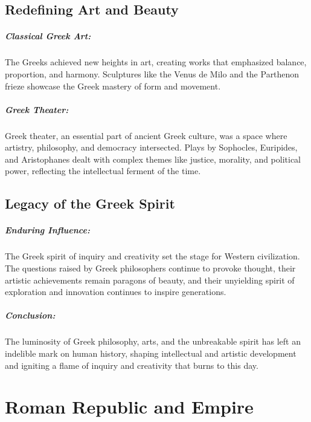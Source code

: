 \documentclass{book}
\begin{document}
\section*{Redefining Art and Beauty}

\paragraph{Classical Greek Art:}
The Greeks achieved new heights in art, creating works that emphasized balance, proportion, and harmony. Sculptures like the Venus de Milo and the Parthenon frieze showcase the Greek mastery of form and movement.

\paragraph{Greek Theater:}
Greek theater, an essential part of ancient Greek culture, was a space where artistry, philosophy, and democracy intersected. Plays by Sophocles, Euripides, and Aristophanes dealt with complex themes like justice, morality, and political power, reflecting the intellectual ferment of the time.

\section*{Legacy of the Greek Spirit}

\paragraph{Enduring Influence:}
The Greek spirit of inquiry and creativity set the stage for Western civilization. The questions raised by Greek philosophers continue to provoke thought, their artistic achievements remain paragons of beauty, and their unyielding spirit of exploration and innovation continues to inspire generations.

\paragraph{Conclusion:}
The luminosity of Greek philosophy, arts, and the unbreakable spirit has left an indelible mark on human history, shaping intellectual and artistic development and igniting a flame of inquiry and creativity that burns to this day.

\chapter{Roman Republic and Empire}
\end{document}
